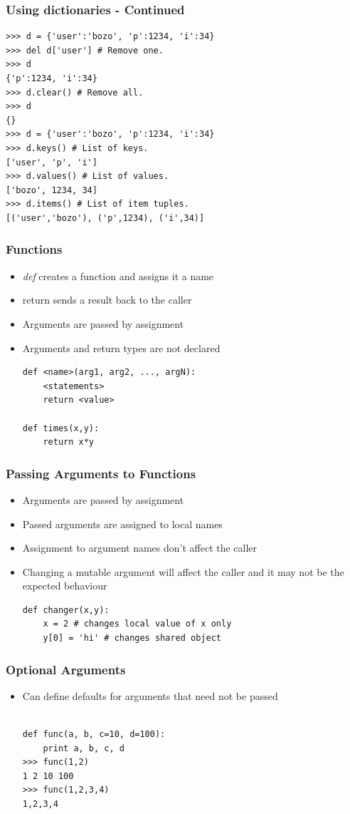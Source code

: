 \documentclass[12pt,handout]{beamer}
\begin{document}
\begin{frame}[fragile]
\frametitle{Using dictionaries - Continued}
\small{
\begin{verbatim}
>>> d = {'user':'bozo', 'p':1234, 'i':34}
>>> del d['user'] # Remove one.
>>> d
{'p':1234, 'i':34}
>>> d.clear() # Remove all.
>>> d
{}
>>> d = {'user':'bozo', 'p':1234, 'i':34}
>>> d.keys() # List of keys.
['user', 'p', 'i']
>>> d.values() # List of values.
['bozo', 1234, 34]
>>> d.items() # List of item tuples.
[('user','bozo'), ('p',1234), ('i',34)]
\end{verbatim}
}
\end{frame}
 
\begin{frame}[fragile]
\frametitle{Functions}
\begin{itemize}
\item {\it def} creates a function and assigns it a name
\item return sends a result back to the caller
\item Arguments are passed by assignment
\item Arguments and return types are not declared
\small{
\begin{verbatim}
def <name>(arg1, arg2, ..., argN):
    <statements>
    return <value>

def times(x,y):
    return x*y
\end{verbatim}
}
\end{itemize}
\end{frame}

\begin{frame}[fragile]
\frametitle{Passing Arguments to Functions}
\begin{itemize}
\item Arguments are passed by assignment
\item Passed arguments are assigned to local names
\item Assignment to argument names don't affect the 
caller
\item Changing a mutable argument will affect the caller
  and it may not be the expected behaviour
\small{
\begin{verbatim}
def changer(x,y):
    x = 2 # changes local value of x only
    y[0] = 'hi' # changes shared object
\end{verbatim}
}

\end{itemize}
\end{frame}

\begin{frame}[fragile]
\frametitle{Optional Arguments}
\begin{itemize}

\item Can define defaults for arguments that need not be 
passed
\small{
\begin{verbatim}

def func(a, b, c=10, d=100):
    print a, b, c, d
>>> func(1,2)
1 2 10 100
>>> func(1,2,3,4)
1,2,3,4
\end{verbatim}
}
\end{itemize}
\end{frame}
\end{document}
